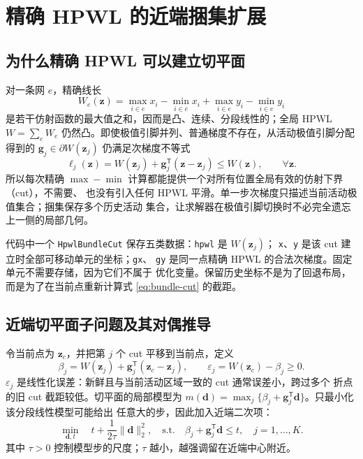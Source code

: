 \documentclass[UTF8,fontset=windows,a4paper,11pt]{ctexart}
\begin{document}
\section{精确 HPWL 的近端捆集扩展}

\subsection{为什么精确 HPWL 可以建立切平面}

对一条网 $e$，精确线长
\begin{equation}
 W_e(\bm z)=\max_{i\in e}x_i-\min_{i\in e}x_i
              +\max_{i\in e}y_i-\min_{i\in e}y_i
\end{equation}
是若干仿射函数的最大值之和，因而是凸、连续、分段线性的；全局 HPWL
$W=\sum_e W_e$ 仍然凸。即使极值引脚并列、普通梯度不存在，从活动极值引脚分配得到的
$\bm g_j\in\partial W(\bm z_j)$ 仍满足次梯度不等式
\begin{equation}
 \ell_j(\bm z)=W(\bm z_j)+\bm g_j^\mathsf{T}(\bm z-\bm z_j)
 \leq W(\bm z),\qquad \forall\bm z.
 \label{eq:bundle-cut}
\end{equation}
所以每次精确 $\max-\min$ 计算都能提供一个对所有位置全局有效的仿射下界（cut），不需要、
也没有引入任何 HPWL 平滑。单一步次梯度只描述当前活动极值集合；捆集保存多个历史活动
集合，让求解器在极值引脚切换时不必完全遗忘上一侧的局部几何。

代码中一个 \texttt{HpwlBundleCut} 保存五类数据：\texttt{hpwl} 是 $W(\bm z_j)$；
\texttt{x}、\texttt{y} 是该 cut 建立时全部可移动单元的坐标；\texttt{gx}、
\texttt{gy} 是同一点精确 HPWL 的合法次梯度。固定单元不需要存储，因为它们不属于
优化变量。保留历史坐标不是为了回退布局，而是为了在当前点重新计算式
\eqref{eq:bundle-cut} 的截距。

\subsection{近端切平面子问题及其对偶推导}

令当前点为 $\bm z_c$，并把第 $j$ 个 cut 平移到当前点，定义
\begin{equation}
 \beta_j=W(\bm z_j)+\bm g_j^\mathsf{T}(\bm z_c-\bm z_j),
 \qquad
 \varepsilon_j=W(\bm z_c)-\beta_j\geq0.
\end{equation}
$\varepsilon_j$ 是线性化误差：新鲜且与当前活动区域一致的 cut 通常误差小，跨过多个
折点的旧 cut 截距较低。切平面的局部模型为
$m(\bm d)=\max_j\{\beta_j+\bm g_j^\mathsf{T}\bm d\}$。只最小化该分段线性模型可能给出
任意大的步，因此加入近端二次项：
\begin{equation}
 \min_{\bm d,t}\quad t+\frac{1}{2\tau}\|\bm d\|_2^2,
 \quad\text{s.t.}\quad
 \beta_j+\bm g_j^\mathsf{T}\bm d\leq t,\quad j=1,\ldots,K.
 \label{eq:bundle-primal}
\end{equation}
其中 $\tau>0$ 控制模型步的尺度；$\tau$ 越小，越强调留在近端中心附近。
\end{document}
